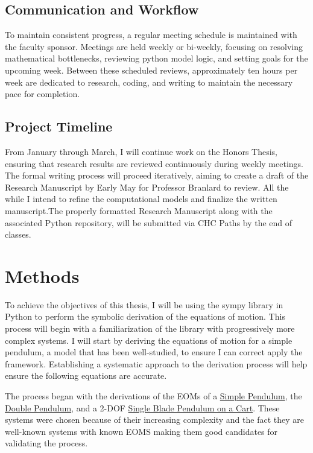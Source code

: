 \documentclass[onecolumn,draftcls]{IEEEtran}
\begin{document}
\subsection{Communication and Workflow}
To maintain consistent progress, a regular meeting schedule is maintained with the faculty sponsor. Meetings are held weekly or bi-weekly, focusing on resolving mathematical bottlenecks, reviewing python model logic, and setting goals for the upcoming week. Between these scheduled reviews, approximately ten hours per week are dedicated to research, coding, and writing to maintain the necessary pace for completion.

\subsection{Project Timeline}
From January through March, I will continue work on the Honors Thesis, ensuring that research results are reviewed continuously during weekly meetings. The formal writing process will proceed iteratively, aiming to create a draft of the Research Manuscript by Early May for Professor Branlard to review. All the while I intend to refine the computational models and finalize the written manuscript.The properly formatted Research Manuscript along with the associated Python repository, will be submitted via CHC Paths by the end of classes.


\section{Methods}
To achieve the objectives of this thesis, I will be using the sympy library in Python to perform the symbolic derivation of the equations of motion. This process will begin with a familiarization of the library with progressively more complex systems. I will start by deriving the equations of motion for a simple pendulum, a model that has been well-studied, to ensure I can correct apply the framework. Establishing a systematic approach to the derivation process will help ensure the following equations are accurate.

The process began with the derivations of the EOMs of a \hyperref[app:simple_pendulum]{Simple Pendulum}, the \hyperref[app:double_pendulum]{Double Pendulum}, and a 2-DOF \hyperref[app:pendulum_cart]{Single Blade Pendulum on a Cart}. These systems were chosen because of their increasing complexity and the fact they are well-known systems with known EOMS making them good candidates for validating the process.
\end{document}
